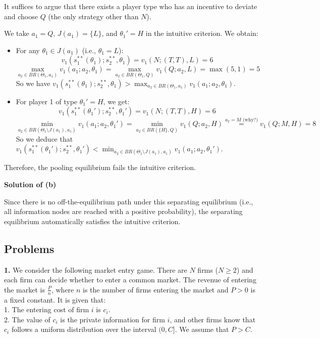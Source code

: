\documentclass[twoside]{article}
\theoremstyle{definitionstyle}
\begin{document}
It suffices to argue that there exists a player type who has an incentive to deviate and choose $Q$ (the only strategy other than $N$).

We take $a_1 = Q$, $J(a_1) = \{L\}$, and $\theta_1' = H$ in the intuitive criterion. We obtain:
\begin{itemize}
    \item For any $\theta_1 \in J(a_1)$ (i.e., $\theta_1 = L$):
    $$v_1(s_1^{**}(\theta_1); s_2^{**}, \theta_1) = v_1(N; (T, T), L) = 6$$
    $$\max_{a_2 \in BR(\Theta_1, a_1)} v_1(a_1; a_2, \theta_1) = \max_{a_2 \in BR(\Theta_1, Q)} v_1(Q; a_2, L) = \max(5, 1) = 5$$
    So we have $v_1(s_1^{**}(\theta_1); s_2^{**}, \theta_1) > \max_{a_2 \in BR(\Theta_1, a_1)} v_1(a_1; a_2, \theta_1)$.
    
    \item For player 1 of type $\theta_1' = H$, we get:
    $$v_1(s_1^{**}(\theta_1'); s_2^{**}, \theta_1') = v_1(N; (T, T), H) = 6$$
    $$\min_{a_2 \in BR(\Theta_1 \setminus J(a_1), a_1)} v_1(a_1; a_2, \theta_1') = \min_{a_2 \in BR(\{H\}, Q)} v_1(Q; a_2, H) \overset{a_2=M \text{ (why?)}}{=} v_1(Q; M, H) = 8$$
    So we deduce that $v_1(s_1^{**}(\theta_1'); s_2^{**}, \theta_1') < \min_{a_2 \in BR(\Theta_1 \setminus J(a_1), a_1)} v_1(a_1; a_2, \theta_1')$.
\end{itemize}
Therefore, the pooling equilibrium fails the intuitive criterion.


\textbf{Solution of (b)}

Since there is no off-the-equilibrium path under this separating equilibrium (i.e., all information nodes are reached with a positive probability), the separating equilibrium automatically satisfies the intuitive criterion.


\subsection*{Problems}
\textbf{1.}
We consider the following market entry game. There are $N$ firms ($N \geq 2$) and each firm can decide whether to enter a common market. The revenue of entering the market is $\frac{P}{n}$, where $n$ is the number of firms entering the market and $P > 0$ is a fixed constant. It is given that:\\
1. The entering cost of firm $i$ is $c_i$.\\
2. The value of $c_i$ is the private information for firm $i$, and other firms know that $c_i$ follows a uniform distribution over the interval $(0, C]$. We assume that $P > C$.\\
\end{document}
